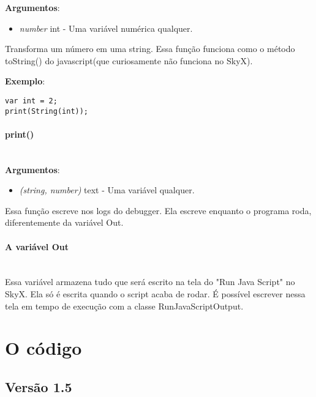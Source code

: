 \documentclass{article}
\begin{document}
\textbf{Argumentos}:

\begin{itemize}
    \item \emph{number} int - Uma variável numérica qualquer.
\end{itemize}

Transforma um número em uma string. Essa função funciona como o método toString() do javascript(que curiosamente não funciona no SkyX).

\textbf{Exemplo}:

\begin{lstlisting}
var int = 2;
print(String(int));
\end{lstlisting}

\paragraph{print()}\mbox{}\\

\textbf{Argumentos}:

\begin{itemize}
    \item \emph{(string, number)} text - Uma variável qualquer.
\end{itemize}

Essa função escreve nos logs do debugger. Ela escreve enquanto o programa roda, diferentemente da variável Out.

\paragraph{A variável Out}\mbox{}\\

Essa variável armazena tudo que será escrito na tela do "Run Java Script" no SkyX. Ela só é escrita quando o script acaba de rodar. É possível escrever nessa tela em tempo de execução com a classe RunJavaScriptOutput.

\section{O código}

\subsection{Versão 1.5}
\end{document}
